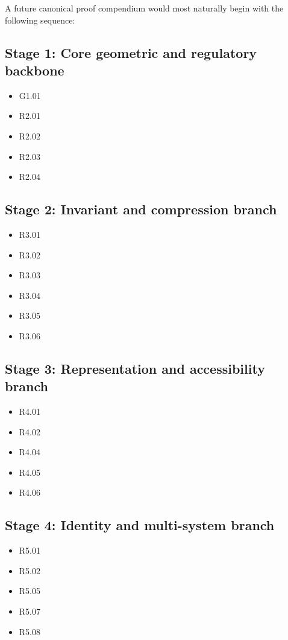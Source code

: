 \documentclass[12pt]{article}
\begin{document}
	A future canonical proof compendium would most naturally begin with the following sequence:
	
	\subsection*{Stage 1: Core geometric and regulatory backbone}
	\begin{itemize}[leftmargin=2em]
		\item G1.01
		\item R2.01
		\item R2.02
		\item R2.03
		\item R2.04
	\end{itemize}
	
	\subsection*{Stage 2: Invariant and compression branch}
	\begin{itemize}[leftmargin=2em]
		\item R3.01
		\item R3.02
		\item R3.03
		\item R3.04
		\item R3.05
		\item R3.06
	\end{itemize}
	
	\subsection*{Stage 3: Representation and accessibility branch}
	\begin{itemize}[leftmargin=2em]
		\item R4.01
		\item R4.02
		\item R4.04
		\item R4.05
		\item R4.06
	\end{itemize}
	
	\subsection*{Stage 4: Identity and multi-system branch}
	\begin{itemize}[leftmargin=2em]
		\item R5.01
		\item R5.02
		\item R5.05
		\item R5.07
		\item R5.08
	\end{itemize}
	
\end{document}
